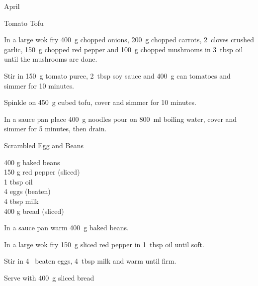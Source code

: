 \begin{menu}{April}
\begin{recipe}{2}{Tomato Tofu}
    \begin{instructions}
    \item 
        In a large wok fry
        400~g chopped onions,
        200~g chopped carrots,
        2~cloves crushed garlic,
        150~g chopped red pepper
        and
        100~g chopped mushrooms
        in
        3~tbsp  oil
        until the mushrooms are done.
      \item 
        Stir in
        150~g  tomato puree,
        2~tbsp  soy sauce
        and
        400~g  can tomatoes
        and simmer for 10 minutes.
      \item 
        Spinkle on
        450~g cubed tofu,
        cover and simmer for 10 minutes.
      \item 
      In a 
      sauce pan
      place
      400~g  noodles
      pour on
      800~ml  boiling water,
      cover and simmer for 5 minutes, then drain.
    
    \end{instructions}
    \end{recipe}%
  
    \begin{recipe}{1}{Scrambled Egg and Beans}%
		\begin{ingredients}
		400 g baked beans  \\
	150 g red pepper (sliced) \\
	1 tbsp oil  \\
	4  eggs (beaten) \\
	4 tbsp milk  \\
	400 g bread (sliced) \\
	
		\end{ingredients}
	
    \begin{instructions}
    \item 
        In a sauce pan warm
        400~g  baked beans.
      \item 
        In a large wok fry
        150~g sliced red pepper
        in
        1~tbsp  oil
        until soft.
      \item 
        Stir in
        4~ beaten eggs,
        4~tbsp  milk
        and warm until firm.
      \item 
        Serve with
        400~g sliced bread
    \end{instructions}
    \end{recipe}%
  
    \clearpage
    \end{menu}
	
